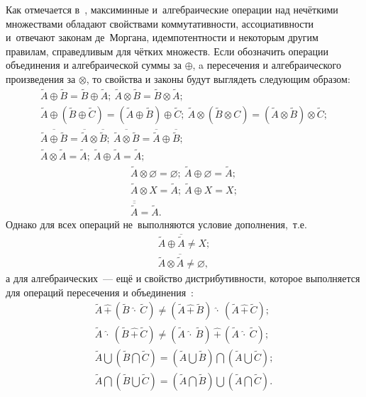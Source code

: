 Как отмечается в~\cite{Axioms_Fuzzy_Algebra, Kaufmann, Lipetsk}, максиминные и~алгебраические операции над нечёткими множествами обладают свойствами коммутативности, ассоциативности и~отвечают законам де~Моргана, идемпотентности и некоторым другим правилам, справедливым для чётких множеств. Если обозначить операции объединения и алгебраической суммы за $\oplus$, a пересечения и алгебраического произведения за $\otimes$, то свойства и законы будут выглядеть следующим образом:
\begin{gather*}
	\tilde A \oplus \tilde B = \tilde B \oplus \tilde A;\ \tilde A \otimes \tilde B = \tilde B \otimes \tilde A; \allowbreak \\
	\tilde A \oplus \left(\tilde B \oplus \tilde C \right) = \left( \tilde A \oplus \tilde B \right) \oplus \tilde C;\ \tilde A \otimes \left(\tilde B \otimes C \right) = \left( \tilde A \otimes \tilde B \right) \otimes \tilde C; \allowbreak \\
	\overline{\tilde A \oplus \tilde B}=\overline{\tilde A} \otimes \overline{\tilde B};\  \overline{\tilde A \otimes \tilde B}=\overline{\tilde A} \oplus \overline{\tilde B}; \allowbreak \\
	\tilde A \otimes \tilde A = \tilde A;\ \tilde A \oplus \tilde A = \tilde A;
\end{gather*}
\begin{gather*}
	\tilde A \otimes \varnothing = \varnothing;\ \tilde A \oplus \varnothing = \tilde A; \allowbreak \\
	\tilde A \otimes X = \tilde A;\ \tilde A \oplus X = X; \\
	\overline{\overline{\tilde A}} = \tilde A.
\end{gather*}
Однако для всех операций не~выполняются условие дополнения,~т.е.
\begin{gather*}
	\tilde{A} \oplus \overline{\tilde{A}}\ne X; \\
	\tilde{A} \otimes \overline{\tilde{A}}\ne \varnothing,
\end{gather*}
а для алгебраических~--- ещё и свойство дистрибутивности, которое выполняется для операций пересечения и объединения~\cite{Ryzhov}:
\begin{gather*}
	\tilde{A}\, \widehat{+}\, \left( \tilde{B}\ \widehat{\cdot}\ \tilde C \right) \neq \left( \tilde A\, \widehat{+}\, \tilde B \right)\ \widehat{\cdot}\ \left(\tilde A\, \widehat{+}\, \tilde C \right); \\
		\tilde{A}\ \widehat{\cdot}\ \left( \tilde{B}\, \widehat{+}\, \tilde C \right) \neq \left( \tilde A\ \widehat{\cdot}\ \tilde B \right)\, \widehat{+}\, \left(\tilde A\ \widehat{\cdot}\ \tilde C \right); \\
	\tilde A \bigcup \left( \tilde B \bigcap \tilde C \right) = \left(\tilde A \bigcup \tilde B \right) \bigcap \left(\tilde A \bigcup \tilde C \right); \\
	\tilde A \bigcap \left( \tilde B \bigcup \tilde C \right) = \left(\tilde A \bigcap \tilde B \right) \bigcup \left(\tilde A \bigcap \tilde C \right).
\end{gather*}

